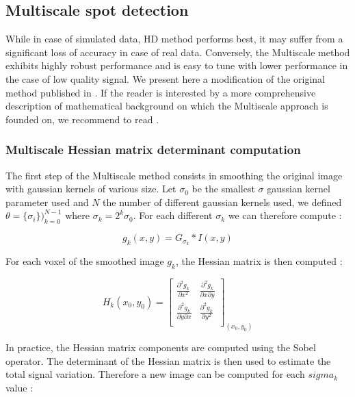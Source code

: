 \documentclass[12pt]{article}
\begin{document}
\subsection{Multiscale spot detection}

While in case of simulated data, HD method performs best, it may suffer from a significant loss of accuracy in case of real data. Conversely, the Multiscale method exhibits highly robust performance and is easy to tune with lower performance in the case of low quality signal. We present here a modification of the original method published in \citep{foltankova_hybrid_2013}. If the reader is interested by a more comprehensive description of mathematical background on which the Multiscale approach is founded on, we recommend to read \citep{jin_vascular_2013}.


\subsubsection{Multiscale Hessian matrix determinant computation}

The first step of the Multiscale method consists in smoothing the original image with gaussian kernels of various size. Let $\sigma_{0}$ be the smallest $\sigma$ gaussian kernel parameter used and $N$ the number of different gaussian kernels used, we defined $\theta = \{\sigma_{i}\})_{k=0}^{N-1}$ where $\sigma_{k} =2^{k} \sigma_{0}$. For each different $\sigma_{k}$ we can therefore compute :

\begin{equation}
g_{k}(x,y) = G_{\sigma_{k}} * I(x,y)
\end{equation}

For each voxel of the smoothed image $g_{k}$, the Hessian matrix is then  computed :

\begin{equation}
H_{k}(x_{0},y_{0}) = \begin{bmatrix}
\frac{\partial^2 g_{k}}{\partial x^2} & \frac{\partial^2 g_{k}}{\partial x \partial y} \\
\frac{\partial^2 g_{k}}{\partial y \partial x} & \frac{\partial^2 g_{k}}{\partial y^2} \\
\end{bmatrix}_{(x_{0},y_{0})}
\end{equation}

In practice, the Hessian matrix components are computed using the Sobel operator. The determinant of the Hessian matrix is then used to estimate the total signal variation. Therefore a new image can be computed for each $sigma_{k}$ value :
\end{document}
